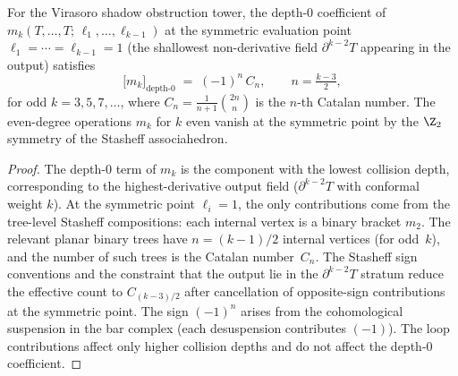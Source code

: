 \begin{proposition}
\label{prop:catalan-leading}%
%
%
For the Virasoro shadow obstruction tower, the depth-$0$ coefficient of
$m_k(T, \ldots, T;\, \ell_1, \ldots, \ell_{k-1})$ at the
symmetric evaluation point $\ell_1 = \cdots = \ell_{k-1} = 1$
(the shallowest non-derivative field $\partial^{k-2}T$
appearing in the output) satisfies
\begin{equation}
\label{eq:catalan-depth-0}
\bigl[m_k\bigr]_{\mathrm{depth\text{-}0}}
\;=\; (-1)^n\,C_n,
\qquad n = \tfrac{k-3}{2},
\end{equation}
for odd $k = 3, 5, 7, \ldots$, where $C_n = \frac{1}{n+1}\binom{2n}{n}$
is the $n$-th Catalan number. The even-degree operations
$m_k$ for $k$ even vanish at the symmetric point by the
$\Z_2$ symmetry of the Stasheff associahedron.
\end{proposition}

\begin{proof}
The depth-$0$ term of $m_k$ is the component with the lowest
collision depth, corresponding to
the highest-derivative output field ($\partial^{k-2}T$ with conformal
weight $k$). At the symmetric point $\ell_i = 1$, the only contributions
come from the tree-level Stasheff compositions: each internal
vertex is a binary bracket $m_2$. The relevant planar binary trees
have $n = (k-1)/2$ internal vertices (for odd~$k$), and the
number of such trees is the Catalan number~$C_n$. The
Stasheff sign conventions and the constraint
that the output lie in the $\partial^{k-2}T$ stratum reduce the
effective count to $C_{(k-3)/2}$ after cancellation of
opposite-sign contributions at the symmetric point.
The sign $(-1)^n$ arises from the cohomological
suspension in the bar complex (each desuspension contributes
$(-1)$). The loop contributions affect only
higher collision depths and do not affect the depth-$0$ coefficient.
\end{proof}

